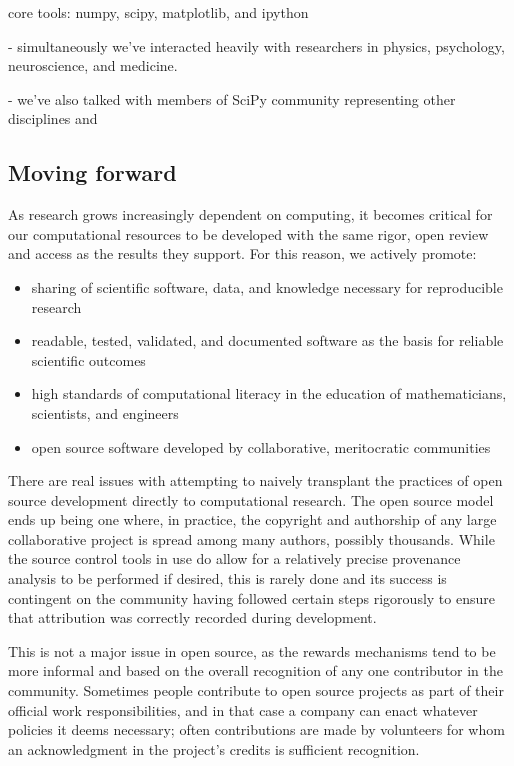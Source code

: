 \documentclass[ChapterTOCs,krantz2]{krantz} %
\theoremstyle{definition}
\begin{document}
core tools: numpy, scipy, matplotlib, and ipython

- simultaneously we've interacted heavily with researchers in
physics, psychology, neuroscience, and medicine.

- we've also talked with members of SciPy community representing
other disciplines and 

\subsection{Moving forward}

As research grows increasingly dependent on computing, it becomes critical
for our computational resources to be developed with the same rigor, open review
and access as the results they support.  For this reason, we actively promote:

\begin{itemize}

\item sharing of scientific software, data, and knowledge necessary for
reproducible research

\item readable, tested, validated, and documented software as the basis for
reliable scientific outcomes

\item high standards of computational literacy in the education of
mathematicians, scientists, and engineers

\item open source software developed by collaborative, meritocratic
communities

\end{itemize}

There are real issues with attempting to
naively transplant the practices of open source development directly
to computational research. The open source model ends up being one
where, in practice, the copyright and authorship of any large collaborative
project is spread among many authors, possibly thousands. While
the source control tools in use do allow for a relatively precise
provenance analysis to be performed if desired, this is rarely done
and its success is contingent on the community having followed certain
steps rigorously to ensure that attribution was correctly recorded
during development.

This is not a major issue in open source, as the rewards mechanisms
tend to be more informal and based on the overall recognition of any
one contributor in the community. Sometimes people contribute to open
source projects as part of their official work responsibilities, and
in that case a company can enact whatever policies it deems necessary;
often contributions are made by volunteers for whom an acknowledgment
in the project's credits is sufficient recognition.
\end{document}
